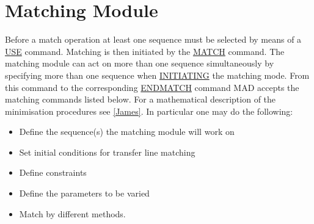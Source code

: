  
\chapter{Matching Module}

Before a match operation at least one sequence must be selected by means of a \href{../control/general.html#use}{USE} command. Matching is then initiated by the \href{match_main.html}{MATCH} command. The matching module can act on more than one sequence simultaneously by  specifying more than one sequence when  \href{match_main.html#match}{INITIATING} the matching mode.  From this command to the corresponding \href{match_main.html#endmatch}{ENDMATCH} command MAD accepts the matching commands listed below. For a mathematical description of the minimisation procedures see \href{bibliography.html#minuit}{[James]}. In particular one may do the following: 
\begin{itemize}
	\item Define the sequence(s) the matching module will work on 
	\item Set initial conditions for transfer line matching 
	\item Define constraints 
	\item Define the parameters to be varied 
	\item Match by different methods. 
\end{itemize}

